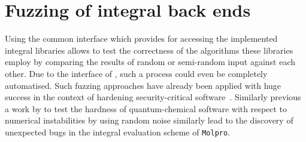 
\section{Fuzzing of integral back ends}
\label{sec:Fuzzing}
Using the common interface which \molsturm provides
for accessing the implemented integral libraries
allows to test the correctness
of the algorithms these libraries employ
by comparing the results of
random or semi-random input against each other.
Due to the \python interface of \molsturm, such a process could
even be completely automatised.
Such fuzzing approaches have already been applied with huge success
in the context of hardening security-critical software~\cite{Fuzzing}.
Similarly previous a work by \citet{Knizia2011} to test
the hardness of quantum-chemical software
with respect to numerical instabilities by using random noise
similarly lead to the discovery of unexpected bugs
in the integral evaluation scheme of \texttt{Molpro}.
